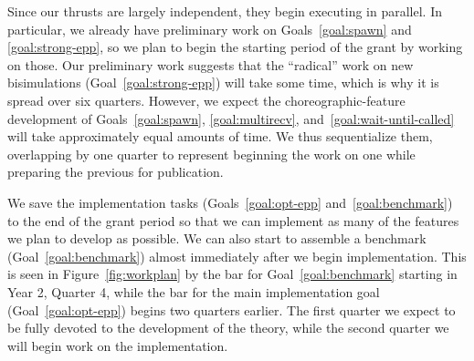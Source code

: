 Since our thrusts are largely independent, they begin executing in parallel.
In particular, we already have preliminary work on Goals~\ref{goal:spawn} and \ref{goal:strong-epp}, so we plan to begin the starting period of the grant by working on those.
Our preliminary work suggests that the ``radical'' work on new bisimulations (Goal~\ref{goal:strong-epp}) will take some time, which is why it is spread over six quarters.
However, we expect the choreographic-feature development of Goals~\ref{goal:spawn}, \ref{goal:multirecv}, and~\ref{goal:wait-until-called} will take approximately equal amounts of time.
We thus sequentialize them, overlapping by one quarter to represent beginning the work on one while preparing the previous for publication.

We save the implementation tasks (Goals~\ref{goal:opt-epp} and~\ref{goal:benchmark}) to the end of the grant period so that we can implement as many of the features we plan to develop as possible.
We can also start to assemble a benchmark (Goal~\ref{goal:benchmark}) almost immediately after we begin implementation.
This is seen in Figure~\ref{fig:workplan} by the bar for Goal~\ref{goal:benchmark} starting in Year 2, Quarter 4, while the bar for the main implementation goal (Goal~\ref{goal:opt-epp}) begins two quarters earlier.
The first quarter we expect to be fully devoted to the development of the theory, while the second quarter we will begin work on the implementation.

